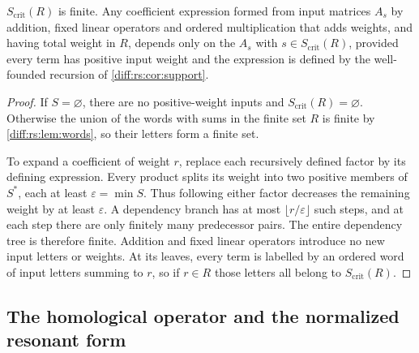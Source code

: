 \documentclass[11pt,letterpaper]{article}
\numberwithin{equation}{section}
\theoremstyle{definition}
\theoremstyle{remark}
\newcommand{\crit}{\mathrm{crit}}
\begin{document}
\begin{lemma}
\label{diff:rs:lem:critical}
$S_{\crit}(R)$ is finite. Any coefficient expression formed from input
matrices $A_{s}$ by addition, fixed linear operators and ordered multiplication
that adds weights, and having total weight in $R$, depends only on the $A_{s}$
with $s\in S_{\crit}(R)$, provided every term has positive input weight and the
expression is defined by the well-founded recursion of
\cref{diff:rs:cor:support}.
\end{lemma}
\begin{proof}
If $S=\varnothing$, there are no positive-weight inputs and
$S_{\crit}(R)=\varnothing$. Otherwise the union of the words with sums
in the finite set $R$ is finite by \cref{diff:rs:lem:words}, so their
letters form a finite set.

To expand a coefficient of weight $r$, replace each recursively defined
factor by its defining expression. Every product splits its weight into
two positive members of $S^{*}$, each at least $\varepsilon=\min S$.
Thus following either factor decreases the remaining weight by at least
$\varepsilon$. A dependency branch has at most
$\lfloor r/\varepsilon\rfloor$ such steps, and at each step there are
only finitely many predecessor pairs. The entire dependency tree is
therefore finite. Addition and fixed linear operators introduce no new
input letters or weights. At its leaves, every term is labelled by an
ordered word of input letters summing to $r$, so if $r\in R$ those
letters all belong to $S_{\crit}(R)$.
\end{proof}

\subsection{The homological operator and the normalized resonant form}
\label{diff:rs:sub:normal}
\end{document}
